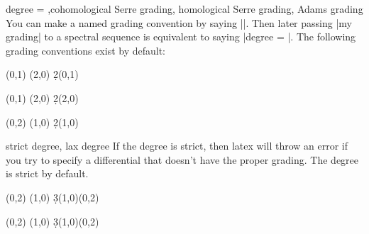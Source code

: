\begin{sseqdata}[|| name = ex1, cohomological Serre grading]
\begin{keylist}{degree = ,cohomological Serre grading, homological Serre grading, Adams grading}
You can make a named grading convention by saying \codeverb||. Then later passing |my grading| to a spectral sequence is equivalent to saying |degree = |. The following grading conventions exist by default:
\begin{codeexample}[width = 6cm]
\begin{sseqpage}
\class(0,1)
\class(2,0)
\d2(0,1)
\end{sseqpage}
\end{codeexample}
\begin{codeexample}[width = 6cm]
\begin{sseqpage}
\class(0,1)
\class(2,0)
\d2(2,0)
\end{sseqpage}
\end{codeexample}
\begin{codeexample}[width = 6cm]
\begin{sseqpage}
\class(0,2)
\class(1,0)
\d2(1,0)
\end{sseqpage}
\end{codeexample}
\end{keylist}

\begin{keylist}{strict degree, lax degree}
If the degree is strict, then latex will throw an error if you try to specify a differential that doesn't have the proper grading. The degree is strict by default.
\begin{codeexample}
\begin{sseqdata}[ name = laxdegree, Adams grading ]
\class(0,2)
\class(1,0)
\d3(1,0)(0,2) %
\end{sseqdata}
\end{codeexample}

\begin{codeexample}[]
\begin{sseqdata}[ name = laxdegree, Adams grading, lax degree, yscale = 0.6 ]
\class(0,2)
\class(1,0)
\d3(1,0)(0,2) %
\end{sseqdata}
\printpage[ name = laxdegree, page = 3 ]
\end{codeexample}
\end{keylist}


\end{sseqdata}
